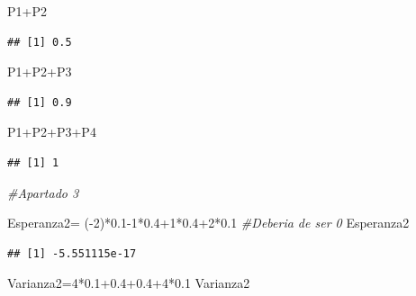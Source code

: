 \documentclass[
]{article}
\newenvironment{Shaded}{\begin{snugshade}}{\end{snugshade}}
\newcommand{\CommentTok}[1]{\textcolor[rgb]{0.56,0.35,0.01}{\textit{#1}}}
\newcommand{\DecValTok}[1]{\textcolor[rgb]{0.00,0.00,0.81}{#1}}
\newcommand{\FloatTok}[1]{\textcolor[rgb]{0.00,0.00,0.81}{#1}}
\newcommand{\NormalTok}[1]{#1}
\newcommand{\OtherTok}[1]{\textcolor[rgb]{0.56,0.35,0.01}{#1}}
\newcommand{\SpecialCharTok}[1]{\textcolor[rgb]{0.00,0.00,0.00}{#1}}
\begin{document}
\begin{Shaded}
\begin{Highlighting}[]
\NormalTok{P1}\SpecialCharTok{+}\NormalTok{P2}
\end{Highlighting}
\end{Shaded}

\begin{verbatim}
## [1] 0.5
\end{verbatim}

\begin{Shaded}
\begin{Highlighting}[]
\NormalTok{P1}\SpecialCharTok{+}\NormalTok{P2}\SpecialCharTok{+}\NormalTok{P3}
\end{Highlighting}
\end{Shaded}

\begin{verbatim}
## [1] 0.9
\end{verbatim}

\begin{Shaded}
\begin{Highlighting}[]
\NormalTok{P1}\SpecialCharTok{+}\NormalTok{P2}\SpecialCharTok{+}\NormalTok{P3}\SpecialCharTok{+}\NormalTok{P4}
\end{Highlighting}
\end{Shaded}

\begin{verbatim}
## [1] 1
\end{verbatim}

\begin{Shaded}
\begin{Highlighting}[]
\CommentTok{\#Apartado 3}

\NormalTok{Esperanza2}\OtherTok{=}\NormalTok{ (}\SpecialCharTok{{-}}\DecValTok{2}\NormalTok{)}\SpecialCharTok{*}\FloatTok{0.1}\DecValTok{{-}1}\SpecialCharTok{*}\FloatTok{0.4}\SpecialCharTok{+}\DecValTok{1}\SpecialCharTok{*}\FloatTok{0.4}\SpecialCharTok{+}\DecValTok{2}\SpecialCharTok{*}\FloatTok{0.1}
\CommentTok{\#Deberia de ser 0}
\NormalTok{Esperanza2}
\end{Highlighting}
\end{Shaded}

\begin{verbatim}
## [1] -5.551115e-17
\end{verbatim}

\begin{Shaded}
\begin{Highlighting}[]
\NormalTok{Varianza2}\OtherTok{=}\DecValTok{4}\SpecialCharTok{*}\FloatTok{0.1+0.4+0.4}\SpecialCharTok{+}\DecValTok{4}\SpecialCharTok{*}\FloatTok{0.1}
\NormalTok{Varianza2}
\end{Highlighting}
\end{Shaded}
\end{document}
